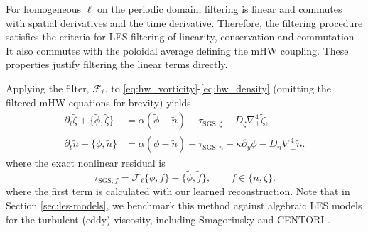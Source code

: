 \documentclass[authoryear,preprint,review,12pt]{elsarticle}
\begin{document}
For homogeneous $\ell$ on the periodic domain, filtering is linear and commutes with spatial derivatives and the time derivative. Therefore, the filtering procedure satisfies the criteria for LES filtering of linearity, conservation and commutation \citep{sagaut_large_2006}. 
It also commutes with the poloidal average defining the mHW coupling. 
These properties justify filtering the linear terms directly. 

Applying the filter, $\mathcal{F}_\ell$, to \eqref{eq:hw_vorticity}-\eqref{eq:hw_density} (omitting the filtered mHW equations for brevity) yields
\begin{align}
    \partial_t\widetilde\zeta+\{\widetilde\phi,\widetilde\zeta\}
    &=\alpha(\widetilde\phi-\widetilde n)
      -\tau_{\mathrm{SGS},\zeta}-D_\zeta\nabla_\perp^4\widetilde\zeta,
    \label{eq:filtered_hw_vorticity}\\
    \partial_t\widetilde n+\{\widetilde\phi,\widetilde n\}
    &=\alpha(\widetilde\phi-\widetilde n)
      -\tau_{\mathrm{SGS},n}-\kappa\partial_y\widetilde\phi
      -D_n\nabla_\perp^4\widetilde n.
    \label{eq:filtered_hw_density}
\end{align}
where the exact nonlinear residual is
\begin{equation}
    \tau_{\mathrm{SGS},f}
    =\mathcal{F}_\ell\{\phi,f\}-\{\widetilde\phi,\widetilde f\},
    \qquad f\in\{n,\zeta\}.
    \label{eq:sgs_bracket}
\end{equation}
where the first term is calculated with our learned reconstruction. Note that in Section \ref{sec:les-models}, we benchmark this method against algebraic LES models for the turbulent (eddy) viscosity, including Smagorinsky and CENTORI \citep{smagorinsky1963general, knight2012centori, leddy2016thesis}.
\end{document}
